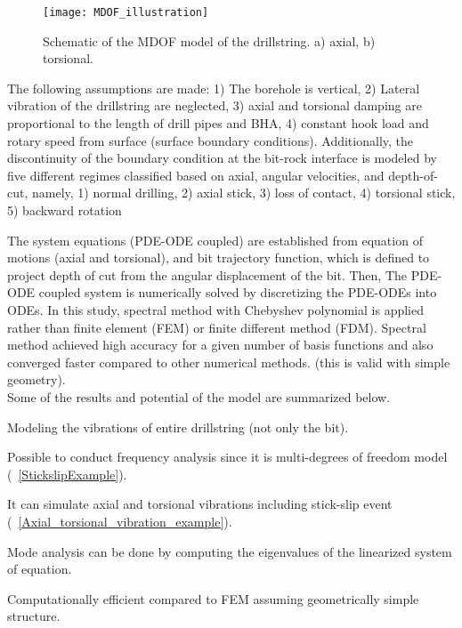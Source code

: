 \begin{figure}[ht]
  \centering
  \texttt{[image: MDOF\_illustration]}
  \caption[Schematic of the MDOF model of the drillstring]{Schematic of the MDOF model of the drillstring. a) axial, b) torsional.}\label{MDOF_illustration}
\end{figure}

The following assumptions are made: 1) The borehole is vertical, 2) Lateral vibration of the drillstring are neglected, 3) axial and torsional damping are proportional to the length of drill pipes and BHA, 4) constant hook load and rotary speed from surface (surface boundary conditions). Additionally, the discontinuity of the boundary condition at the bit-rock interface is modeled by
five different regimes classified based on axial, angular velocities, and depth-of-cut, namely, 1) normal drilling, 2) axial stick, 3) loss of contact, 4) torsional stick, 5) backward rotation

The system equations (PDE-ODE coupled) are established from equation of motions (axial and torsional), and bit trajectory function, which is defined to project depth of cut from the angular displacement of the bit. Then,
The PDE-ODE coupled system is numerically solved by discretizing the PDE-ODEs into ODEs. In this study, spectral method with Chebyshev polynomial is applied rather than finite element (FEM) or finite different method (FDM). Spectral method achieved high accuracy for a given number of basis functions and also converged faster compared to other numerical methods. (this is valid with simple geometry). \\

\noindent Some of the results and potential of the model are summarized below.
\begin{bulletedlist}
  \item Modeling the vibrations of entire drillstring (not only the bit).
  \item Possible to conduct frequency analysis since it is multi-degrees of freedom model (\figurename~\ref{StickslipExample}).
  \item It can simulate axial and torsional vibrations including stick-slip event (\figurename~\ref{Axial_torsional_vibration_example}).
  \item Mode analysis can be done by computing the eigenvalues of the linearized system of equation.
  \item Computationally efficient compared to FEM assuming geometrically simple structure.
\end{bulletedlist}

